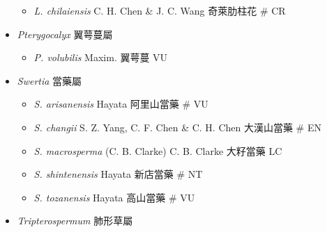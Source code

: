 \begin{itemize}
  \begin{itemize}
        \item[] \textit{L. chilaiensis} C. H. Chen \& J. C. Wang  奇萊肋柱花  \# CR
  \end{itemize}
 \item[] \textit{Pterygocalyx} 翼萼蔓屬
                                
  \begin{itemize}
        \item[] \textit{P. volubilis} Maxim.  翼萼蔓   VU
  \end{itemize}
 \item[] \textit{Swertia} 當藥屬
                                
  \begin{itemize}
        \item[] \textit{S. arisanensis} Hayata  阿里山當藥  \# VU
        \item[] \textit{S. changii} S. Z. Yang, C. F. Chen \& C. H. Chen  大漢山當藥  \# EN
        \item[] \textit{S. macrosperma} (C. B. Clarke) C. B. Clarke  大籽當藥   LC
        \item[] \textit{S. shintenensis} Hayata  新店當藥  \# NT
        \item[] \textit{S. tozanensis} Hayata  高山當藥  \# VU
  \end{itemize}
 \item[] \textit{Tripterospermum} 肺形草屬
                                

\end{itemize}
